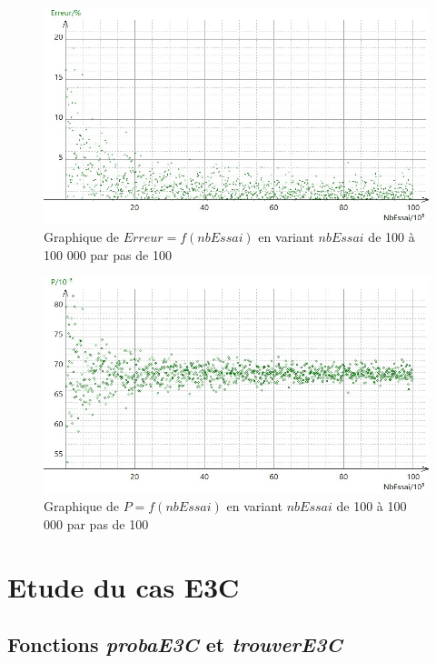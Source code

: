 \documentclass{report}
\begin{document}
\begin{figure}[H]
	\includegraphics[width=\textwidth]{../graphe/Erreur3CR2L(n).jpg}
	\caption{Graphique de $Erreur=f(nbEssai)$ en variant $nbEssai$ de 100 à 100 000 par pas de 100}
\end{figure}	

\begin{figure}[H]
	\includegraphics[width=\textwidth]{../graphe/P3CR2L(n).jpg}
	\caption{Graphique de $P=f(nbEssai)$ en variant $nbEssai$ de 100 à 100 000 par pas de 100}
\end{figure}	




\newpage
\section{Etude du cas E3C}
\subsection{Fonctions \textit{probaE3C} et \textit{trouverE3C}}
\end{document}
